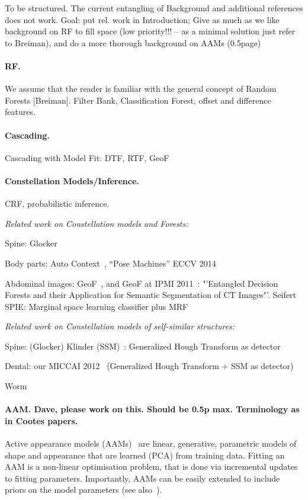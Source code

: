 \documentclass[10pt,twocolumn,letterpaper]{article}
\begin{document}
To be structured. The current entangling of Background and additional references does not work. 
Goal: put rel. work in Introduction; Give as much as we like background on RF to fill space (low priority!!! -- as a minimal solution just refer to Breiman), and do a more thorough background on AAMs (0.5page)

\paragraph{RF. }
We assume that the reader is familiar with the general concept of Random Forests [Breiman]. Filter Bank, Classification Forest, offset and difference features. 

\paragraph{Cascading. }

Cascading with Model Fit: DTF, RTF, GeoF

\paragraph{Constellation Models/Inference. }
CRF, probabilistic inference.

\emph{Related work on Constellation models and Forests: }

Spine: Glocker~\cite{Glocker2013}

Body parts: Auto Context~\cite{AutoContext2008}, "`Pose Machines"' ECCV 2014~\cite{PoseMachinesECCV2014}

Abdominal images: GeoF~\cite{GeoForests2013}, and GeoF at IPMI 2011~\cite{CriminisiAbdominalIPMI2011}: "'Entangled Decision Forests and their Application for Semantic Segmentation of CT Images"'. Seifert SPIE: Marginal space learning classifier plus MRF~\cite{SeifertAnatomicalSPIE2009} 

\emph{Related work on Constellation models of self-similar structures: }

Spine: (Glocker) Klinder (SSM)~\cite{Klinder2009471}: Generalized Hough Transform as detector

Dental: our MICCAI 2012~\cite{TeethMICCAI2012} (Generalized Hough Transform + SSM as detector)

Worm~\cite{WormMiccai2014}


\paragraph{AAM. Dave, please work on this. Should be 0.5p max. Terminology as in Cootes papers.}
Active appearance models (AAMs)~\cite{CootesAAM2001} are linear, generative, parametric models of shape and appearance that are learned (PCA) from training data.  Fitting an AAM is a non-linear optimisation problem, that is done via incremental updates to fitting parameters.  Importantly, AAMs can be easily extended to include priors on the model parameters (see also~\cite{BakerAAM2004}).  
\end{document}
